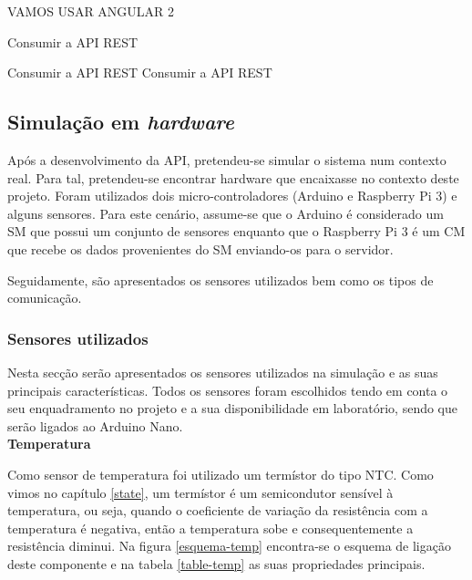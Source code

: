 VAMOS USAR ANGULAR 2




Consumir a API REST 

Consumir a API REST 
Consumir a API REST 


\subsection{Simulação em \textit{hardware}}


Após a desenvolvimento da API, pretendeu-se simular o sistema num contexto real. Para tal, pretendeu-se encontrar hardware que encaixasse no contexto deste projeto. Foram utilizados dois micro-controladores (Arduino e Raspberry Pi 3) e alguns sensores. Para este cenário, assume-se que o Arduino é considerado um \acl{SM} que possui um conjunto de sensores enquanto que o Raspberry Pi 3 é um \acl{CM} que recebe os dados provenientes do \acl{SM} enviando-os para o servidor.  

Seguidamente, são apresentados os sensores utilizados bem como os tipos de comunicação. 
 
\newpage
\subsubsection{Sensores utilizados}

Nesta secção serão apresentados os sensores utilizados na simulação e as suas principais características. Todos os sensores foram escolhidos tendo em conta o seu enquadramento no projeto e a sua disponibilidade em laboratório, sendo que serão ligados ao Arduino Nano. \\


\textbf{Temperatura}


Como sensor de temperatura foi utilizado um termístor do tipo \ac{NTC}. Como vimos no capítulo \ref{state}, um termístor é um semicondutor sensível à temperatura, ou seja, quando o coeficiente de variação da resistência com a temperatura é negativa, então a temperatura sobe e consequentemente a resistência diminui. Na figura \ref{esquema-temp} encontra-se o esquema de ligação deste componente e na tabela \ref{table-temp} as suas propriedades principais. 


